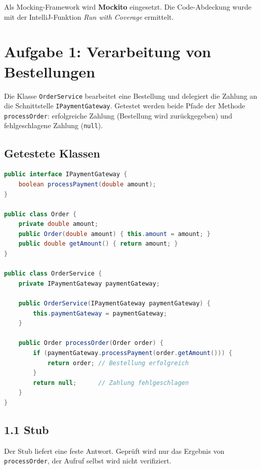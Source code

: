 \documentclass[
	fontsize=12pt,          %
	paper=a4,               %
	numbers=noenddot,       %
	listof=totoc,           %
	listof=entryprefix,     %
	listof=nochaptergap,    %
	bibliography=totoc,     %
	parskip=half,           %
	openany                 %
]{scrbook}
\begin{document}
Als Mocking-Framework wird \textbf{Mockito} eingesetzt. Die Code-Abdeckung
wurde mit der IntelliJ-Funktion \emph{Run with Coverage} ermittelt.


\chapter*{Aufgabe 1: Verarbeitung von Bestellungen}

Die Klasse \texttt{OrderService} bearbeitet eine Bestellung und delegiert die
Zahlung an die Schnittstelle \texttt{IPaymentGateway}. Getestet werden beide
Pfade der Methode \texttt{processOrder}: erfolgreiche Zahlung (Bestellung wird
zurückgegeben) und fehlgeschlagene Zahlung (\texttt{null}).

\section*{Getestete Klassen}

\begin{lstlisting}[language=Java]
public interface IPaymentGateway {
    boolean processPayment(double amount);
}

public class Order {
    private double amount;
    public Order(double amount) { this.amount = amount; }
    public double getAmount() { return amount; }
}

public class OrderService {
    private IPaymentGateway paymentGateway;

    public OrderService(IPaymentGateway paymentGateway) {
        this.paymentGateway = paymentGateway;
    }

    public Order processOrder(Order order) {
        if (paymentGateway.processPayment(order.getAmount())) {
            return order; // Bestellung erfolgreich
        }
        return null;      // Zahlung fehlgeschlagen
    }
}
\end{lstlisting}

\section*{1.1 Stub}

Der Stub liefert eine feste Antwort. Geprüft wird nur das Ergebnis von
\texttt{processOrder}, der Aufruf selbst wird nicht verifiziert.
\end{document}
